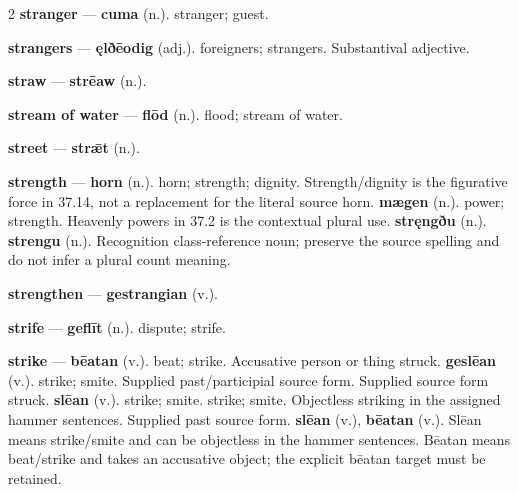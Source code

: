 \begin{multicols}{2}
\textbf{stranger} — \textbf{cuma} (n.). stranger; guest.\par
\textbf{strangers} — \textbf{ęlðēodig} (adj.). foreigners; strangers. Substantival adjective.\par
\textbf{straw} — \textbf{strēaw} (n.).\par
\textbf{stream of water} — \textbf{flōd} (n.). flood; stream of water.\par
\textbf{street} — \textbf{strǣt} (n.).\par
\textbf{strength} — \textbf{horn} (n.). horn; strength; dignity. Strength/dignity is the figurative force in 37.14, not a replacement for the literal source horn. \textbf{mægen} (n.). power; strength. Heavenly powers in 37.2 is the contextual plural use. \textbf{stręngðu} (n.).  \textbf{strengu} (n.). Recognition class-reference noun; preserve the source spelling and do not infer a plural count meaning.\par
\textbf{strengthen} — \textbf{gestrangian} (v.).\par
\textbf{strife} — \textbf{geflīt} (n.). dispute; strife.\par
\textbf{strike} — \textbf{bēatan} (v.). beat; strike. Accusative person or thing struck. \textbf{geslēan} (v.). strike; smite. Supplied past/participial source form. Supplied source form struck. \textbf{slēan} (v.). strike; smite. strike; smite. Objectless striking in the assigned hammer sentences. Supplied past source form. \textbf{slēan} (v.), \textbf{bēatan} (v.). Slēan means strike/smite and can be objectless in the hammer sentences. Bēatan means beat/strike and takes an accusative object; the explicit bēatan target must be retained.\par

\end{multicols}
